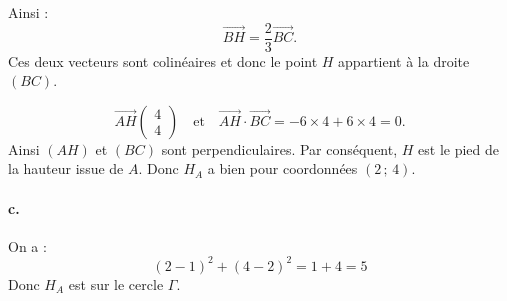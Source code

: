 \documentclass[10pt]{article}
\begin{document}
Ainsi :
\[
\overrightarrow{BH} = \dfrac{2}{3} \overrightarrow{BC}.
\]
Ces deux vecteurs sont colinéaires et donc le point \( H \) appartient à la droite \( (BC) \).

\[
\overrightarrow{AH} \begin{pmatrix} 4 \\ 4 \end{pmatrix} \quad \text{et} \quad \overrightarrow{AH} \cdot \overrightarrow{BC} = -6 \times 4 + 6 \times 4 = 0.
\]
Ainsi \( (AH) \) et \( (BC) \) sont perpendiculaires.  
Par conséquent, \( H \) est le pied de la hauteur issue de \( A \).  
Donc \( H_A \) a bien pour coordonnées \( (2\,;\,4) \).

\paragraph{c.} On a :
\[
(2 - 1)^2 + (4 - 2)^2 = 1 + 4 = 5
\]
Donc \( H_A \) est sur le cercle \( \Gamma \).
\end{document}
